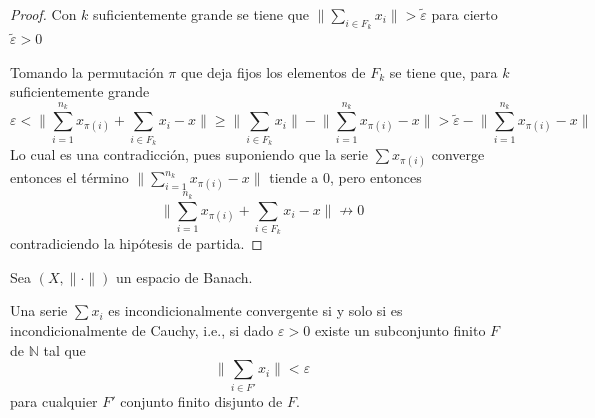 \begin{proof}
			Con $k$ suficientemente grande se tiene que $\big\| \displaystyle \sum_{i \in F_k}{x_i} \big\| > \tilde\varepsilon$ para cierto $\tilde \varepsilon >0$
			
			Tomando la permutación $\pi$ que deja fijos los elementos de $F_k$ se tiene que, para $k$ suficientemente grande 
			$$\varepsilon < \big\|  \sum_{i=1}^{n_k}{x_{\pi(i)}} + \sum_{i \in F_k}{x_i} - x \big\| \geq   \big\| \sum_{i \in F_k}{x_i} \big\| - \big\| \sum_{i=1}^{n_k}{x_{\pi(i)}}  - x\big\| > \tilde\varepsilon -  \big\|  \sum_{i=1}^{n_k}{x_{\pi(i)}}  - x\big\|$$
			Lo cual es una contradicción, pues suponiendo que la serie $\sum{x_{\pi(i)}}$ converge entonces el término $\big\| \displaystyle \sum_{i=1}^{n_k}{x_{\pi(i)}}  - x\big\|$ tiende a 0, pero entonces 
			$$\big\| \sum_{i=1}^{n_k}{x_{\pi(i)}} + \sum_{i \in F_k}{x_i} - x \big\| \not\longrightarrow 0$$
			contradiciendo la hipótesis de partida.
			
		\end{proof}
	
	
	
	
	
	
	
	Sea $(X,\|\cdot\|)$ un espacio de Banach.
	
	\begin{lemma}\label{lm:incon-cauchy}		
		Una serie $\sum{x_i}$ es incondicionalmente convergente si y solo si es incondicionalmente de Cauchy, i.e., si dado $\varepsilon > 0$ existe un subconjunto finito $F$ de $\mathbb{N}$ tal que 
		$$\big\| \sum_{i \in F'}{x_i} \big\|< \varepsilon$$
		para cualquier $F'$ conjunto finito disjunto de $F$.
		
	\end{lemma}	
		
